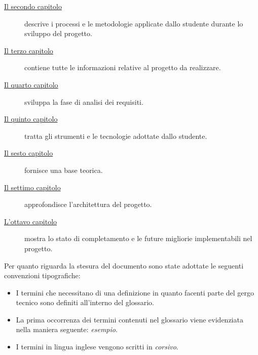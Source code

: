 \begin{description}
    \item[{\hyperref[cap:processi-metodologie]{Il secondo capitolo}}] descrive i processi e le metodologie applicate dallo studente durante lo sviluppo del progetto.
    
    \item[{\hyperref[cap:descrizione-stage]{Il terzo capitolo}}] contiene tutte le informazioni relative al progetto da realizzare.
    
    \item[{\hyperref[cap:analisi-requisiti]{Il quarto capitolo}}] sviluppa la fase di analisi dei requisiti.
    
    \item[{\hyperref[cap:strumenti-tecnologie]{Il quinto capitolo}}] tratta gli strumenti e le tecnologie adottate dallo studente.
    
    \item[{\hyperref[cap:teoria]{Il sesto capitolo}}] fornisce una base teorica.
    
    \item[{\hyperref[cap:progettazione]{Il settimo capitolo}}] approfondisce l'architettura del progetto.
    
    \item[{\hyperref[cap:conclusioni]{L'ottavo capitolo}}] mostra lo stato di completamento e le future migliorie implementabili nel progetto.
\end{description}

Per quanto riguarda la stesura del documento sono state adottate le seguenti convenzioni tipografiche:
\begin{itemize}
	\item I termini che necessitano di una definizione in quanto facenti parte del gergo tecnico sono definiti all'interno del glossario.
	\item La prima occorrenza dei termini contenuti nel glossario viene evidenziata nella maniera seguente: \emph{esempio}\glsfirstoccur.
	\item I termini in lingua inglese vengono scritti in \emph{corsivo}.
\end{itemize}

